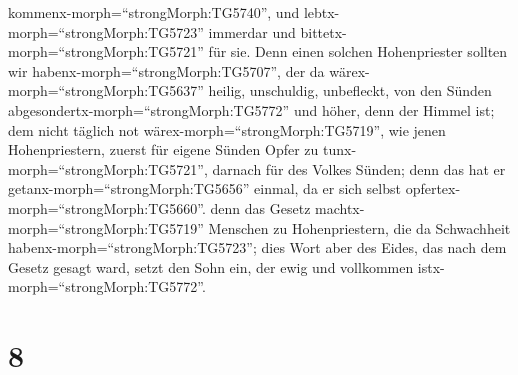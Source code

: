 kommenx-morph=``strongMorph:TG5740'', und
lebtx-morph=``strongMorph:TG5723'' immerdar und
bittetx-morph=``strongMorph:TG5721'' für sie.  Denn einen
solchen Hohenpriester sollten wir habenx-morph=``strongMorph:TG5707'',
der da wärex-morph=``strongMorph:TG5637'' heilig, unschuldig,
unbefleckt, von den Sünden abgesondertx-morph=``strongMorph:TG5772'' und
höher, denn der Himmel ist;  dem nicht täglich not
wärex-morph=``strongMorph:TG5719'', wie jenen Hohenpriestern, zuerst für
eigene Sünden Opfer zu tunx-morph=``strongMorph:TG5721'', darnach für
des Volkes Sünden; denn das hat er getanx-morph=``strongMorph:TG5656''
einmal, da er sich selbst opfertex-morph=``strongMorph:TG5660''.
 denn das Gesetz machtx-morph=``strongMorph:TG5719''
Menschen zu Hohenpriestern, die da Schwachheit
habenx-morph=``strongMorph:TG5723''; dies Wort aber des Eides, das nach
dem Gesetz gesagt ward, setzt den Sohn ein, der ewig und vollkommen
istx-morph=``strongMorph:TG5772''.

\hypertarget{section-7}{%
\section{8}\label{section-7}}

